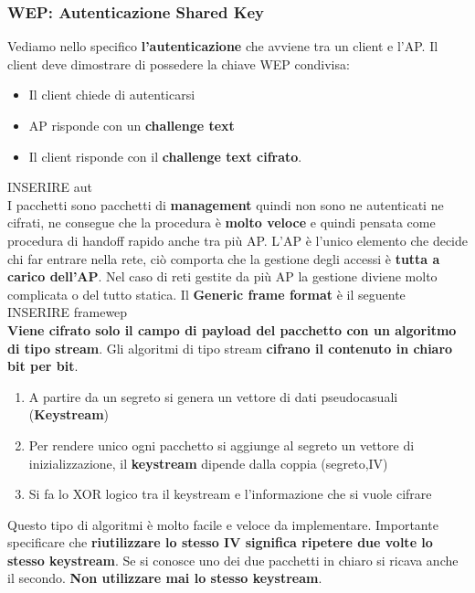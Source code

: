 \documentclass[12pt]{article}
\begin{document}
			\subsubsection{WEP: Autenticazione Shared Key}
				Vediamo nello specifico \textbf{l'autenticazione} che avviene tra un client e l'AP. Il client deve dimostrare di possedere la chiave WEP condivisa:
				\begin{itemize}
					\item Il client chiede di autenticarsi
					\item AP risponde con un \textbf{challenge text}
					\item Il client risponde con il \textbf{challenge text cifrato}.
				\end{itemize}
		
				INSERIRE aut \\
			
				I pacchetti sono pacchetti di \textbf{management} quindi non sono ne autenticati ne cifrati, ne consegue che la procedura è \textbf{molto veloce} e quindi pensata come procedura di handoff rapido anche tra più AP. L'AP è l'unico elemento che decide chi far entrare nella rete, ciò comporta che la gestione degli accessi è \textbf{tutta a carico dell'AP}. Nel caso di reti gestite da più AP la gestione diviene molto complicata o del tutto statica.
				Il \textbf{Generic frame format} è il seguente\\
			
				INSERIRE framewep\\
			
				\textbf{Viene cifrato solo il campo di payload del pacchetto con un algoritmo di tipo stream}. Gli algoritmi di tipo stream \textbf{cifrano il contenuto in chiaro bit per bit}.
				\begin{enumerate}
					\item A partire da un segreto si genera un vettore di dati pseudocasuali  (\textbf{Keystream})
					\item Per rendere unico ogni pacchetto si aggiunge al segreto un vettore di inizializzazione, il \textbf{keystream} dipende dalla coppia (segreto,IV)
					\item Si fa lo XOR logico tra il keystream e l'informazione che si vuole cifrare
				\end{enumerate}
				Questo tipo di algoritmi è molto facile e veloce da implementare. Importante specificare che \textbf{riutilizzare lo stesso IV significa ripetere due volte lo stesso keystream}. Se si conosce uno dei due pacchetti in chiaro si ricava anche il secondo. \textbf{Non utilizzare mai lo stesso keystream}.\\
			
\end{document}
